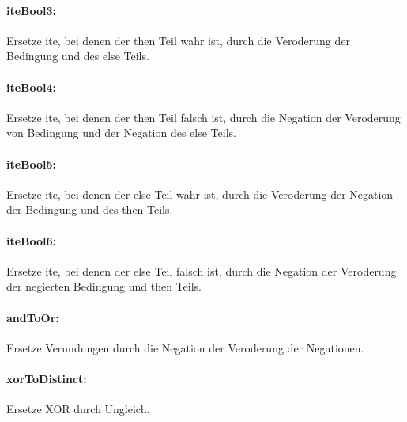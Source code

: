 \documentclass[a4paper]{article}
\begin{document}
\paragraph{iteBool3:} Ersetze ite, bei denen der then Teil wahr ist, durch die Veroderung der Bedingung und des else Teils.
\begin{mathpar}
\end{mathpar}
\paragraph{iteBool4:} Ersetze ite, bei denen der then Teil falsch ist, durch die Negation der Veroderung von Bedingung und der Negation des else Teils.
\begin{mathpar}
\end{mathpar}
\paragraph{iteBool5:} Ersetze ite, bei denen der else Teil wahr ist, durch die Veroderung der Negation der Bedingung und des then Teils.
\begin{mathpar}
\end{mathpar}
\paragraph{iteBool6:} Ersetze ite, bei denen der else Teil falsch ist, durch die Negation der Veroderung der negierten Bedingung und then Teils.
\begin{mathpar}
\end{mathpar}
\paragraph{andToOr:} Ersetze Verundungen durch die Negation der Veroderung der Negationen.
\begin{mathpar}
\end{mathpar}
\paragraph{xorToDistinct:} Ersetze XOR durch Ungleich.
\begin{mathpar}
\end{mathpar}
\end{document}
